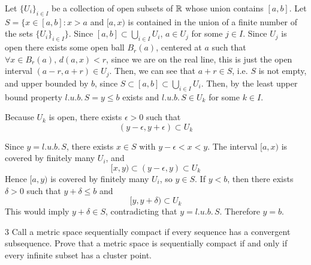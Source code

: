 \documentclass[12pt]{article}
\begin{document}
\begin{solution}
    \bbni

    Let $\{U_i\}_{i \in I}$ be a collection of open subsets of $\mathbb R$ whose union contains $[a, b]$. Let \\ $S = \{x \in [a, b]: x> a$  and $[a, x)$ is contained in the union of a finite number of the sets $\{U_i\}_{i\in I}\}$. Since $[a,b] \subset \underset{i \in I}{\bigcup}U_i$, $a \in U_{j}$ for some $j \in I$. Since $U_{j}$ is open there exists some open ball $B_r(a)$, centered at $a$ such that $\forall x \in B_r(a), \, d(a, x) < r$, since we are on the real line, this is just the open interval $(a-r, a+r) \in U_{j}$. Then, we can see that $a+r \in S$, i.e. $S$ is not empty, and upper bounded by $b$, since $S \subset [a, b] \subset \underset{i \in I}{\bigcup}U_i$. Then, by the least upper bound property $l.u.b. \, S  = y \leq b$ exists and $l.u.b. \, S \in U_k$ for some $k \in I$. 

    Because $U_k$ is open, there exists $\epsilon>0$ such that
    \[(y-\epsilon,y+\epsilon)\subset U_k\]

    Since $y= l.u.b.\, S$, there exists $x\in S$ with $y-\epsilon<x<y$.
    The interval $[a,x)$ is covered by finitely many $U_i$, and
    \[[x,y)\subset (y-\epsilon,y)\subset U_k\]
    Hence $[a,y)$ is covered by finitely many $U_i$, so $y\in S$. If $y<b$, then there exists $\delta>0$ such that $y+\delta\le b$ and
    \[[y,y+\delta)\subset U_k\]
    This would imply $y+\delta\in S$, contradicting that $y=l.u.b. \, S$. Therefore $y=b$.
\end{solution}

\newpage 


\begin{problem}{3}
    Call a metric space sequentially compact if every sequence has a convergent subsequence. Prove that a metric space is sequentially compact if and only if every infinite subset has a cluster point.
\end{problem}
\end{document}
